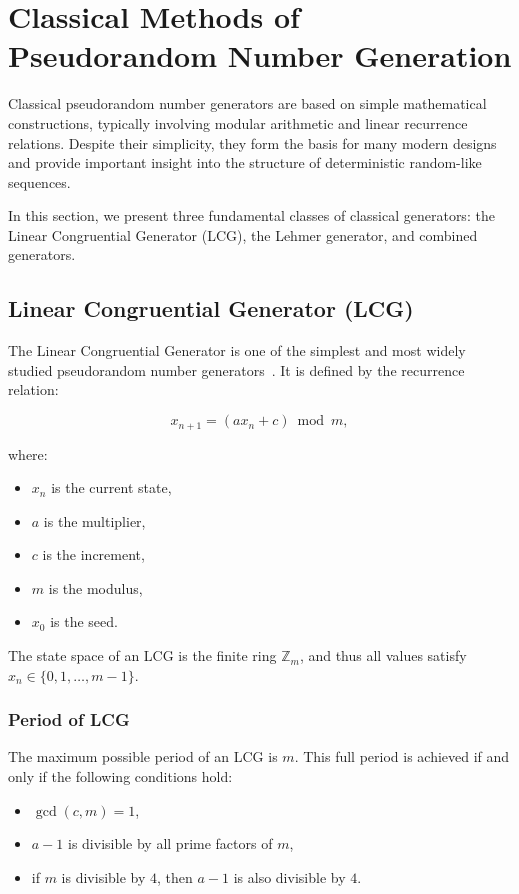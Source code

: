 
\section{Classical Methods of Pseudorandom Number Generation}

Classical pseudorandom number generators are based on simple mathematical constructions, typically involving modular arithmetic and linear recurrence relations. Despite their simplicity, they form the basis for many modern designs and provide important insight into the structure of deterministic random-like sequences.

In this section, we present three fundamental classes of classical generators: the Linear Congruential Generator (LCG), the Lehmer generator, and combined generators.

\subsection{Linear Congruential Generator (LCG)}

The Linear Congruential Generator is one of the simplest and most widely studied pseudorandom number generators~\cite{hull1962random,knuth1997art}. It is defined by the recurrence relation:

\[
x_{n+1} = (a x_n + c) \bmod m,
\]

where:
\begin{itemize}
    \item $x_n$ is the current state,
    \item $a$ is the multiplier,
    \item $c$ is the increment,
    \item $m$ is the modulus,
    \item $x_0$ is the seed.
\end{itemize}

The state space of an LCG is the finite ring $\mathbb{Z}_m$, and thus all values satisfy $x_n \in \{0,1,\dots,m-1\}$.

\subsubsection{Period of LCG}

The maximum possible period of an LCG is $m$. This full period is achieved if and only if the following conditions hold:

\begin{itemize}
    \item $\gcd(c, m) = 1$,
    \item $a - 1$ is divisible by all prime factors of $m$,
    \item if $m$ is divisible by $4$, then $a - 1$ is also divisible by $4$.
\end{itemize}

